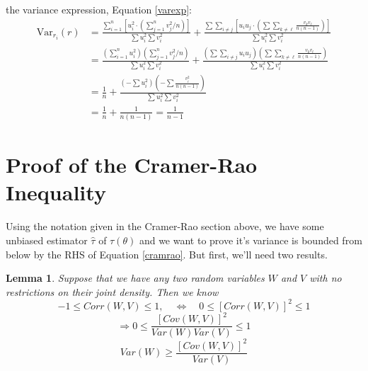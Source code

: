 \documentclass[a4paper,12pt]{scrartcl}
\newtheorem{lem}[thm]{Lemma}
\begin{document}
\begin{itemize}
      the variance expression, Equation \ref{varexp}:
      \begin{align*}
	 \text{Var}_{r_i}(r) &= \frac{\sum_{i=1}^n \left[u^2_i \cdot 
	    \left( \sum^n_{j=1} v^2_j/n\right)\right]  
	    }{
	    \sum u^2_i \sum v^2_i} +
	  \frac{\sum \sum_{i\neq j} \left[u_i u_j\cdot 
	    \left( \sum \sum_{k\neq \ell} \frac{
	       v_k v_\ell}{n(n-1)}
	     \right)\right]
       }{\sum u^2_i \sum v^2_i} \\
       &= \frac{\left(\sum_{i=1}^n u^2_i\right)\left(
	    \sum^n_{j=1} v^2_j/n  \right)
	    }{
	    \sum u^2_i \sum v^2_i} +
	  \frac{\left(\sum \sum_{i\neq j} u_i u_j \right) 
	    \left( \sum \sum_{k\neq \ell} \frac{
	       v_k v_\ell}{n(n-1)}\right)
	  }{\sum u^2_i \sum v^2_i} \\
      &= \frac{1}{n} + \frac{\left(-\sum u^2_i\right)\left(
	 -\sum \frac{v^2_i}{n(n-1)}\right)}{
	 \sum u^2_i \sum v^2_i} \\
      &= \frac{1}{n} + \frac{1}{n(n-1)} = \frac{1}{n-1}
      \end{align*}



\end{itemize}



\newpage

\appendix

\section{Proof of the Cramer-Rao Inequality}

Using the notation given in the Cramer-Rao section above, 
we have some unbiased estimator $\hat{\tau}$ of $\tau(\theta)$ and
we want to prove it's variance is bounded from below by the RHS of 
Equation \ref{cramrao}. But first, we'll need two results.

\begin{lem} Suppose that we have any two random variables $W$ and
   $V$ with no restrictions on their joint density. Then we know
      \[ -1 \leq Corr(W,V) \leq 1, \quad \Leftrightarrow \quad
	 0 \leq [Corr(W,V)]^2 \leq 1 \]
      \[ \Rightarrow 0 \leq \frac{[Cov(W,V)]^2}{Var(W) Var(V)} \leq 1 \]
      \begin{equation}
	 \label{a1}
	 Var(W) \geq \frac{[Cov(W,V)]^2}{Var(V)} 
      \end{equation}
\end{lem}
\end{document}
